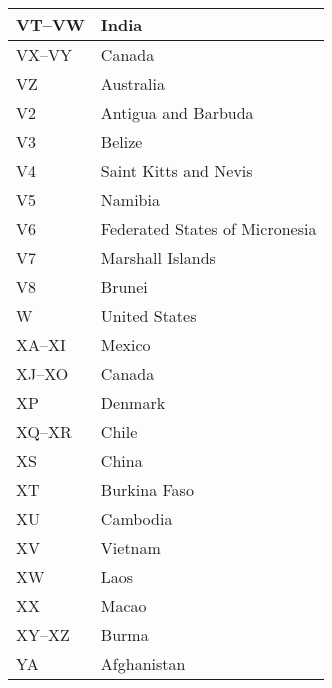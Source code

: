 \begin{longtable}{|l|l|}
  VT--VW              & India                                     \\
  \hline
  VX--VY              & Canada                                    \\
  \hline
  VZ                  & Australia                                 \\
  \hline
  V2                  & Antigua and Barbuda                       \\
  \hline
  V3                  & Belize                                    \\
  \hline
  V4                  & Saint Kitts and Nevis                     \\
  \hline
  V5                  & Namibia                                   \\
  \hline
  V6                  & Federated States of Micronesia            \\
  \hline
  V7                  & Marshall Islands                          \\
  \hline
  V8                  & Brunei                                    \\
  \hline
  W                   & United States                             \\
  \hline
  XA--XI              & Mexico                                    \\
  \hline
  XJ--XO              & Canada                                    \\
  \hline
  XP                  & Denmark                                   \\
  \hline
  XQ--XR              & Chile                                     \\
  \hline
  XS                  & China                                     \\
  \hline
  XT                  & Burkina Faso                              \\
  \hline
  XU                  & Cambodia                                  \\
  \hline
  XV                  & Vietnam                                   \\
  \hline
  XW                  & Laos                                      \\
  \hline
  XX                  & Macao                                     \\
  \hline
  XY--XZ              & Burma                                     \\
  \hline
  YA                  & Afghanistan                               \\

\end{longtable}
